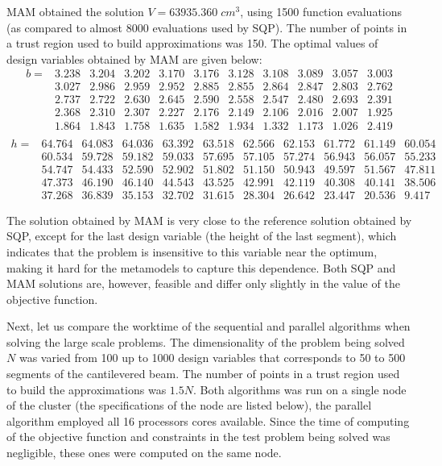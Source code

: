 \documentclass[runningheads,a4paper]{llncs}
\begin{document}
MAM obtained the solution $V = 63935.360\; cm^3$, using 1500 function evaluations (as compared to almost 8000 evaluations used by SQP). The number of points in a trust region used to build approximations was 150. The optimal values of design variables obtained by MAM are given below:
\[
\begin{matrix}
	b=&	3.238&3.204&3.202&3.170&3.176&3.128&3.108&3.089&3.057&3.003 \\  
		& 3.027&2.986&2.959&2.952&2.885&2.855&2.864&2.847&2.803&2.762 \\  
		& 2.737&2.722&2.630&2.645&2.590&2.558&2.547&2.480&2.693&2.391 \\ 
		& 2.368&2.310&2.307&2.227&2.176&2.149&2.106&2.016&2.007&1.925 \\  
		& 1.864&1.843&1.758&1.635&1.582&1.934&1.332&1.173&1.026&2.419 \\ 
\end{matrix}
\]
\[
\begin{matrix}
	h=& 64.764&64.083&64.036&63.392&63.518&62.566&62.153&61.772&61.149& 60.054  \\
		& 60.534&59.728&59.182&59.033&57.695&57.105&57.274&56.943&56.057&55.233  \\
		& 54.747&54.433&52.590&52.902&51.802&51.150&50.943&49.597&51.567&47.811  \\
		& 47.373&46.190&46.140&44.543&43.525&42.991&42.119&40.308&40.141&38.506  \\
		& 37.268&36.839&35.153&32.702&31.615&28.304&26.642&23.447&20.536& 9.417

\end{matrix}
\]

The solution obtained by MAM is very close to the reference solution obtained by SQP, except for the last design variable (the height of the last segment), which indicates that the problem is insensitive to this variable near the optimum, making it hard for the metamodels to capture this dependence. Both SQP and MAM solutions are, however, feasible and differ only slightly in the value of the objective function.

Next, let us compare the worktime of the sequential and parallel algorithms when solving the large scale problems. 
The dimensionality of the problem being solved $N$ was varied from 100 up to 1000 design variables that corresponds to 50 to 500 segments of the cantilevered beam. The number of points in a trust region used to build the approximations was $1.5 N$. 
Both algorithms was run on a single node of the cluster (the specifications of the node are listed below), the parallel algorithm employed all 16 processors cores available. Since the time of computing of the objective 
function and constraints in the test problem being solved was negligible, these ones were computed on the same node.
\end{document}
